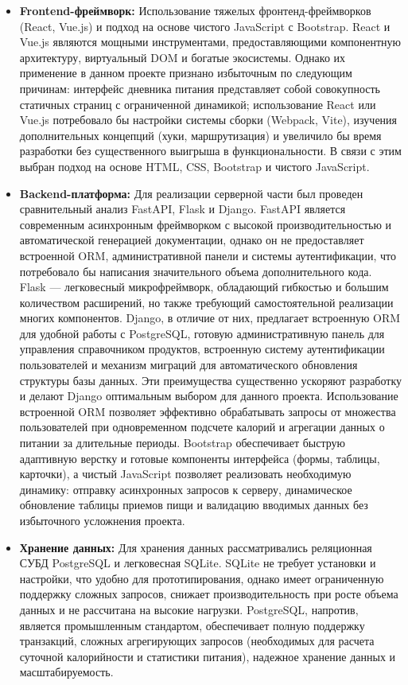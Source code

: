 \begin{itemize}
	\item \textbf{Frontend-фреймворк:} Использование тяжелых фронтенд-фреймворков (React, Vue.js) и подход на основе чистого JavaScript с Bootstrap. React и Vue.js являются мощными инструментами, предоставляющими компонентную архитектуру, виртуальный DOM и богатые экосистемы. Однако их применение в данном проекте признано избыточным по следующим причинам: интерфейс дневника питания представляет собой совокупность статичных страниц с ограниченной динамикой; использование React или Vue.js потребовало бы настройки системы сборки (Webpack, Vite), изучения дополнительных концепций (хуки, маршрутизация) и увеличило бы время разработки без существенного выигрыша в функциональности. В связи с этим выбран подход на основе HTML, CSS, Bootstrap и чистого JavaScript.
	\item \textbf{Backend-платформа:} Для реализации серверной части был проведен сравнительный анализ FastAPI, Flask и Django. FastAPI является современным асинхронным фреймворком с высокой производительностью и автоматической генерацией документации, однако он не предоставляет встроенной ORM, административной панели и системы аутентификации, что потребовало бы написания значительного объема дополнительного кода. Flask — легковесный микрофреймворк, обладающий гибкостью и большим количеством расширений, но также требующий самостоятельной реализации многих компонентов. Django, в отличие от них, предлагает встроенную ORM для удобной работы с PostgreSQL, готовую административную панель для управления справочником продуктов, встроенную систему аутентификации пользователей и механизм миграций для автоматического обновления структуры базы данных. Эти преимущества существенно ускоряют разработку и делают Django оптимальным выбором для данного проекта. Использование встроенной ORM позволяет эффективно обрабатывать запросы от множества пользователей при одновременном подсчете калорий и агрегации данных о питании за длительные периоды. Bootstrap обеспечивает быструю адаптивную верстку и готовые компоненты интерфейса (формы, таблицы, карточки), а чистый JavaScript позволяет реализовать необходимую динамику: отправку асинхронных запросов к серверу, динамическое обновление таблицы приемов пищи и валидацию вводимых данных без избыточного усложнения проекта.
    \item \textbf{Хранение данных:} Для хранения данных рассматривались реляционная СУБД PostgreSQL и легковесная SQLite. SQLite не требует установки и настройки, что удобно для прототипирования, однако имеет ограниченную поддержку сложных запросов, снижает производительность при росте объема данных и не рассчитана на высокие нагрузки. PostgreSQL, напротив, является промышленным стандартом, обеспечивает полную поддержку транзакций, сложных агрегирующих запросов (необходимых для расчета суточной калорийности и статистики питания), надежное хранение данных и масштабируемость.
\end{itemize}

